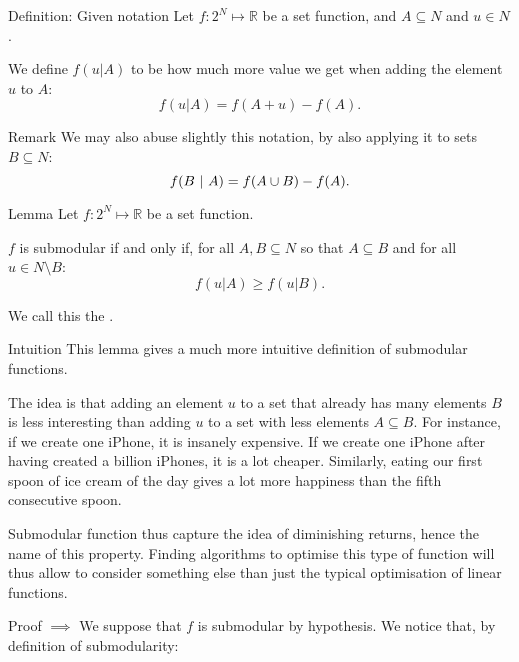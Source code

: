 \documentclass[a4paper]{article}
\begin{document}
\begin{parag}{Definition: Given notation}
    Let $f: 2^N \mapsto \mathbb{R}$ be a set function, and $A \subseteq N$ and $u \in N$.

    We define $f\left(u | A\right)$ to be how much more value we get when adding the element $u$ to $A$: 
    \[f\left(u | A\right) = f\left(A + u\right) - f\left(A\right).\]

    \begin{subparag}{Remark}
        We may also abuse slightly this notation, by also applying it to sets $B \subseteq N$: 
        \[f\left(B \suchthat A\right) = f\left(A \cup B\right) - f\left(A\right).\]
    \end{subparag}
\end{parag}

\begin{parag}{Lemma}
    Let $f: 2^N \mapsto \mathbb{R}$ be a set function.

    $f$ is submodular if and only if, for all $A, B \subseteq N$ so that $A \subseteq B$ and for all $u \in N \setminus B$: 
    \[f\left(u | A\right) \geq f\left(u | B\right).\]

    We call this the .
    
    \begin{subparag}{Intuition}
        This lemma gives a much more intuitive definition of submodular functions.

        The idea is that adding an element $u$ to a set that already has many elements $B$ is less interesting than adding $u$ to a set with less elements $A \subseteq B$. For instance, if we create one iPhone, it is insanely expensive. If we create one iPhone after having created a billion iPhones, it is a lot cheaper. Similarly, eating our first spoon of ice cream of the day gives a lot more happiness than the fifth consecutive spoon.

        Submodular function thus capture the idea of diminishing returns, hence the name of this property. Finding algorithms to optimise this type of function will thus allow to consider something else than just the typical optimisation of linear functions.
    \end{subparag}

    \begin{subparag}{Proof $\implies$}
        We suppose that $f$ is submodular by hypothesis. We notice that, by definition of submodularity: 


\end{subparag}
\end{parag}
\end{document}
